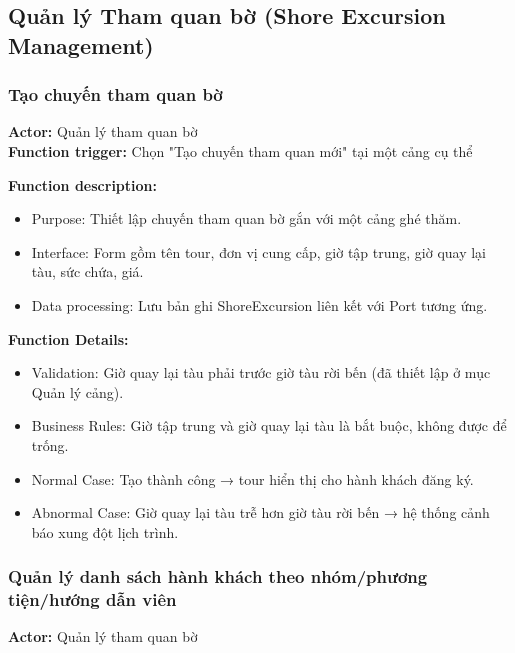 

\subsection{Quản lý Tham quan bờ (Shore Excursion Management)}

\subsubsection{Tạo chuyến tham quan bờ}
\textbf{Actor:} Quản lý tham quan bờ \\
\textbf{Function trigger:} Chọn "Tạo chuyến tham quan mới" tại một cảng
cụ thể

\textbf{Function description:}
\begin{itemize}
    \item Purpose: Thiết lập chuyến tham quan bờ gắn với một cảng ghé
    thăm.
    \item Interface: Form gồm tên tour, đơn vị cung cấp, giờ tập trung,
    giờ quay lại tàu, sức chứa, giá.
    \item Data processing: Lưu bản ghi ShoreExcursion liên kết với Port
    tương ứng.
\end{itemize}

\textbf{Function Details:}
\begin{itemize}
    \item Validation: Giờ quay lại tàu phải trước giờ tàu rời bến (đã
    thiết lập ở mục Quản lý cảng).
    \item Business Rules: Giờ tập trung và giờ quay lại tàu là bắt buộc,
    không được để trống.
    \item Normal Case: Tạo thành công → tour hiển thị cho hành khách đăng
    ký.
    \item Abnormal Case: Giờ quay lại tàu trễ hơn giờ tàu rời bến → hệ
    thống cảnh báo xung đột lịch trình.
\end{itemize}


\subsubsection{Quản lý danh sách hành khách theo nhóm/phương tiện/hướng
dẫn viên}
\textbf{Actor:} Quản lý tham quan bờ

